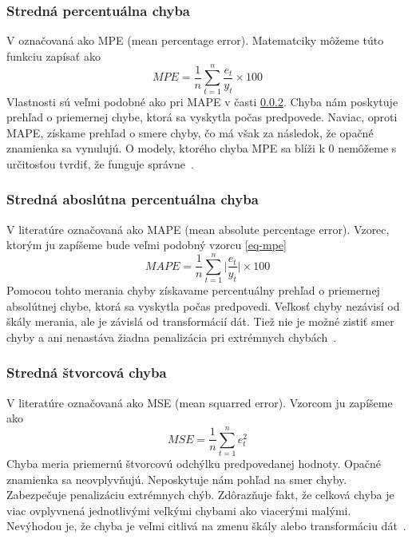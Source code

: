 \documentclass[a4paper,slovak,12pt,appendix]{article}
\begin{document}
\subsubsection{Stredná percentuálna chyba}
V označovaná ako MPE (mean percentage error). Matematciky môžeme túto funkciu
zapísať ako
\begin{equation}
  MPE = \frac{1}{n} \sum_{t=1}^{n} \frac{e_t}{y_t} \times 100
  \label{eq-mpe}
\end{equation}
Vlastnosti sú veľmi podobné ako pri MAPE v časti \ref{mape}. Chyba nám
poskytuje prehľad o priemernej chybe, ktorá sa vyskytla počas predpovede.
Naviac, oproti MAPE, získame prehľad o smere chyby, čo má však za následok, že
opačné znamienka sa vynulujú. O modely, ktorého chyba MPE sa blíži k 0
nemôžeme s určitosťou tvrdiť, že funguje správne~\cite{Agrawal2013}.

\subsubsection{Stredná aboslútna percentuálna chyba}
\label{mape}
V literatúre označovaná ako MAPE (mean absolute percentage error). Vzorec,
ktorým ju zapíšeme bude veľmi podobný vzorcu \ref{eq-mpe}
\begin{equation}
  MAPE = \frac{1}{n} \sum_{t=1}^{n} \Big|\frac{e_t}{y_t}\Big| \times 100
  \label{eq-mape}
\end{equation}
Pomocou tohto merania chyby získavame percentuálny prehľad o priemernej
absolútnej chybe, ktorá sa vyskytla počas predpovedi. Veľkosť chyby nezávisí od
škály merania, ale je závislá od transformácií dát. Tiež nie je možné zistiť
smer chyby a ani nenastáva žiadna penalizácia pri extrémnych
chybách~\cite{Agrawal2013}.

\subsubsection{Stredná štvorcová chyba}
V literatúre označovaná ako MSE (mean squarred error). Vzorcom ju zapíšeme ako
\begin{equation}
  MSE = \frac{1}{n} \sum_{t=1}^{n} e_t^2
  \label{eq-mse}
\end{equation}
Chyba meria priemernú štvorcovú odchýlku predpovedanej hodnoty. Opačné
znamienka sa neovplyvňujú. Neposkytuje nám pohľad na smer chyby. Zabezpečuje
penalizáciu extrémnych chýb. Zdôrazňuje fakt, že celková chyba je viac
ovplyvnená jednotlivými veľkými chybami ako viacerými malými. Nevýhodou je, že
chyba je veľmi citlivá na zmenu škály alebo transformáciu
dát~\cite{Agrawal2013}.
\end{document}
